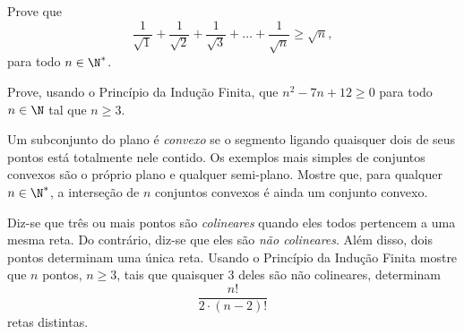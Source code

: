 \begin{exercise}
Prove que
$$\frac 1 {\sqrt 1} +\frac 1 {\sqrt 2} +\frac 1 {\sqrt 3} + \dots + \frac 1 {\sqrt n} \geq \sqrt n,$$
para todo $ n \in \N^*$.
\end{exercise}

\begin{exercise}
	Prove, usando o Princípio da Indução Finita, que $n^2 - 7n +12 \geq 0$ para todo $n \in \N$ tal que $n \geq 3$.
\end{exercise}

\begin{exercise}
Um subconjunto do plano é \emph{convexo} se o segmento ligando quaisquer dois de seus pontos está totalmente nele contido.
Os exemplos mais simples de conjuntos convexos são o próprio plano e qualquer semi-plano.
Mostre que, para qualquer $n \in \N^*$, a interseção de $n$ conjuntos convexos é ainda um conjunto convexo.
\end{exercise}

\begin{exercise}
Diz-se que três ou mais pontos são \emph{colineares} quando eles todos pertencem a uma mesma reta.
Do contrário, diz-se que eles são \emph{não colineares}.
Além disso, dois pontos determinam uma única reta.
Usando o Princípio da Indução Finita mostre que $n$ pontos, $n\geq 3$, tais que quaisquer 3 deles são não colineares, determinam
$$\frac{n!}{2\cdot(n-2)!}$$
retas distintas.
\end{exercise}